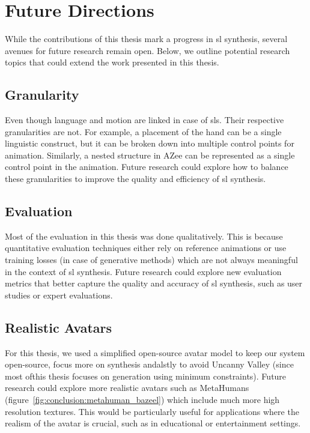 \documentclass[../../main.tex]{subfiles}
\begin{document}
\section{Future Directions}
\label{ch:conclusion:future}

While the contributions of this thesis mark a progress in \gls{sl} synthesis, several avenues for future research remain open. Below, we outline potential research topics that could extend the work presented in this thesis.

\subsection{Granularity}
\label{ch:conclusion:future:granularity}

Even though language and motion are linked in case of \gls{sl}s. Their respective granularities are not. For example, a placement of the hand can be a single linguistic construct, but it can be broken down into multiple control points for animation. Similarly, a nested structure in AZee can be represented as a single control point in the animation. Future research could explore how to balance these granularities to improve the quality and efficiency of \gls{sl} synthesis.

\subsection{Evaluation}
\label{ch:conclusion:future:evaluation}

Most of the evaluation in this thesis was done qualitatively. This is because quantitative evaluation techniques either rely on reference animations or use training losses (in case of generative methods) which are not always meaningful in the context of \gls{sl} synthesis. Future research could explore new evaluation metrics that better capture the quality and accuracy of \gls{sl} synthesis, such as user studies or expert evaluations.

\subsection{Realistic Avatars}
\label{ch:conclusion:future:realistic_avatars}

For this thesis, we used a simplified open-source avatar model to keep our system open-source, focus more on synthesis andalstly to avoid Uncanny Valley (since most ofthis thesis focuses on generation using minimum constraints). Future research could explore more realistic avatars such as MetaHumans (figure~\ref{fig:conclusion:metahuman_bazeel}) which include much more high resolution textures. This would be particularly useful for applications where the realism of the avatar is crucial, such as in educational or entertainment settings. 
\end{document}
